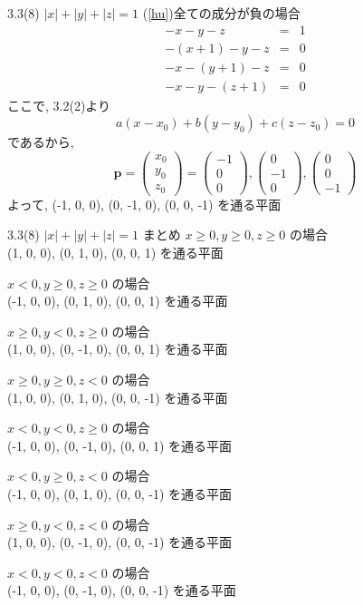 \documentclass{beamer}
\begin{document}
\begin{frame}{3.3(8) $|x| + |y| + |z|  = 1$ \hspace{5mm} (\ref{hu})全ての成分が負の場合}
  \begin{eqnarray*}
    -x - y - z &=& 1\\
    -(x+1) - y - z &=& 0\\
    -x - (y+1) - z &=& 0\\
    -x - y - (z+1) &=& 0
  \end{eqnarray*}
  ここで, 3.2(2)より
  \begin{equation*}
    a(x-x_0) + b(y-y_0) + c(z-z_0) = 0
  \end{equation*}
  であるから,
  \begin{equation*}
    \bm{p} = 
    \begin{pmatrix}
      x_0\\
      y_0\\
      z_0
    \end{pmatrix} =
    \begin{pmatrix}
      -1\\
      0\\
      0
    \end{pmatrix} , 
    \begin{pmatrix}
      0\\
      -1\\
      0
    \end{pmatrix} , 
    \begin{pmatrix}
      0\\
      0\\
      -1
    \end{pmatrix} 
  \end{equation*}
  よって, (-1, 0, 0), (0, -1, 0), (0, 0, -1) を通る平面
\end{frame}

\begin{frame}{3.3(8) $|x| + |y| + |z|  = 1$ \hspace{5mm} まとめ}
  $x \geq 0, y \geq 0, z \geq 0$ の場合 \\
  (1, 0, 0), (0, 1, 0), (0, 0, 1) を通る平面
  
  $x < 0, y \geq 0, z \geq 0$ の場合 \\
  (-1, 0, 0), (0, 1, 0), (0, 0, 1) を通る平面
  
  $x \geq 0, y < 0, z \geq 0$ の場合 \\
  (1, 0, 0), (0, -1, 0), (0, 0, 1) を通る平面

  $x \geq 0, y \geq 0, z < 0$ の場合 \\
  (1, 0, 0), (0, 1, 0), (0, 0, -1) を通る平面

  $x < 0, y < 0, z \geq 0$ の場合 \\
  (-1, 0, 0), (0, -1, 0), (0, 0, 1) を通る平面
  
  $x < 0, y \geq 0, z < 0$ の場合 \\
  (-1, 0, 0), (0, 1, 0), (0, 0, -1) を通る平面

  $x \geq 0, y < 0, z < 0$ の場合 \\
  (1, 0, 0), (0, -1, 0), (0, 0, -1) を通る平面
  
  $x < 0, y < 0, z < 0$ の場合 \\
  (-1, 0, 0), (0, -1, 0), (0, 0, -1) を通る平面
\end{frame}
\end{document}
